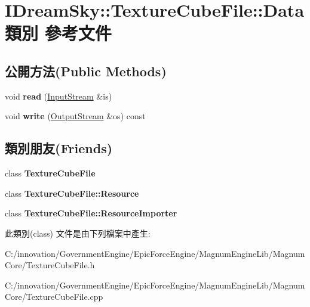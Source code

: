 \hypertarget{class_i_dream_sky_1_1_texture_cube_file_1_1_data}{}\section{I\+Dream\+Sky\+:\+:Texture\+Cube\+File\+:\+:Data 類別 參考文件}
\label{class_i_dream_sky_1_1_texture_cube_file_1_1_data}
\subsection*{公開方法(Public Methods)}
\begin{DoxyCompactItemize}
\item 
void {\bfseries read} (\hyperlink{class_i_dream_sky_1_1_input_stream}{Input\+Stream} \&is)\hypertarget{class_i_dream_sky_1_1_texture_cube_file_1_1_data_ad76942f856810a5fdd06555fc428098f}{}\label{class_i_dream_sky_1_1_texture_cube_file_1_1_data_ad76942f856810a5fdd06555fc428098f}

\item 
void {\bfseries write} (\hyperlink{class_i_dream_sky_1_1_output_stream}{Output\+Stream} \&os) const \hypertarget{class_i_dream_sky_1_1_texture_cube_file_1_1_data_a4e696b1bf0e133f18dd9cd8ecc881aab}{}\label{class_i_dream_sky_1_1_texture_cube_file_1_1_data_a4e696b1bf0e133f18dd9cd8ecc881aab}

\end{DoxyCompactItemize}
\subsection*{類別朋友(Friends)}
\begin{DoxyCompactItemize}
\item 
class {\bfseries Texture\+Cube\+File}\hypertarget{class_i_dream_sky_1_1_texture_cube_file_1_1_data_a5a4cc7500bfedf34cfa4a8a270cc6c13}{}\label{class_i_dream_sky_1_1_texture_cube_file_1_1_data_a5a4cc7500bfedf34cfa4a8a270cc6c13}

\item 
class {\bfseries Texture\+Cube\+File\+::\+Resource}\hypertarget{class_i_dream_sky_1_1_texture_cube_file_1_1_data_a6dd29e2fc99c16ad18aa9e40e44dcc05}{}\label{class_i_dream_sky_1_1_texture_cube_file_1_1_data_a6dd29e2fc99c16ad18aa9e40e44dcc05}

\item 
class {\bfseries Texture\+Cube\+File\+::\+Resource\+Importer}\hypertarget{class_i_dream_sky_1_1_texture_cube_file_1_1_data_abd0103c9043c92f29b4a7e3fe219a646}{}\label{class_i_dream_sky_1_1_texture_cube_file_1_1_data_abd0103c9043c92f29b4a7e3fe219a646}

\end{DoxyCompactItemize}


此類別(class) 文件是由下列檔案中產生\+:\begin{DoxyCompactItemize}
\item 
C\+:/innovation/\+Government\+Engine/\+Epic\+Force\+Engine/\+Magnum\+Engine\+Lib/\+Magnum\+Core/Texture\+Cube\+File.\+h\item 
C\+:/innovation/\+Government\+Engine/\+Epic\+Force\+Engine/\+Magnum\+Engine\+Lib/\+Magnum\+Core/Texture\+Cube\+File.\+cpp\end{DoxyCompactItemize}
